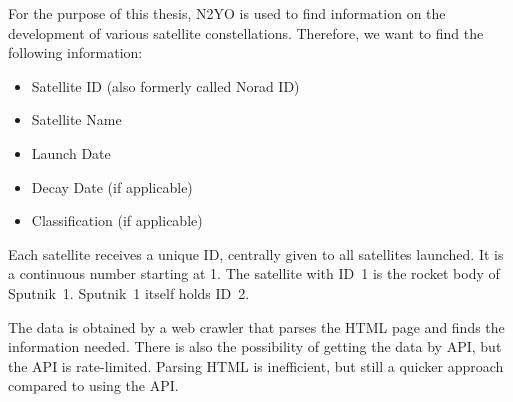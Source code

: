 For the purpose of this thesis, N2YO is used to find information on the
development of various satellite constellations. Therefore, we want to find the
following information:

\begin{itemize}
	\item Satellite ID (also formerly called Norad ID)
	\item Satellite Name
	\item Launch Date
	\item Decay Date (if applicable)
	\item Classification (if applicable)
\end{itemize}

Each satellite receives a unique ID, centrally given to all satellites
launched. It is a continuous number starting at 1. The satellite with ID~1 is
the rocket body of Sputnik~1. Sputnik~1 itself holds ID~2.

The data is obtained by a web crawler that parses the HTML page and finds the
information needed. There is also the possibility of getting the data by API,
but the API is rate-limited. Parsing HTML is inefficient, but still a quicker
approach compared to using the API.
